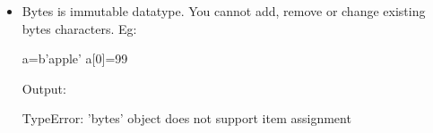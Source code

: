 \begin{flushleft}
\begin{itemize}
		\bigskip
		\item Bytes is immutable datatype. You cannot add, remove or change existing bytes characters.
		\newline
		Eg:			
		\begin{tcolorbox}[breakable,notitle,boxrule=-0pt,colback=code,colframe=code]
			\color{white}
			\font=8pt
			a=b'apple'\newline
			a[0]=99			
			\font=4pt
		\end{tcolorbox}
		
		Output:
		\begin{tcolorbox}[breakable,notitle,boxrule=-0pt,colback=error,colframe=error]
			\color{black}
			TypeError: 'bytes' object does not support item assignment
			\font=4pt
		\end{tcolorbox}
		
	\end{itemize}
	
\end{flushleft}

\newpage

